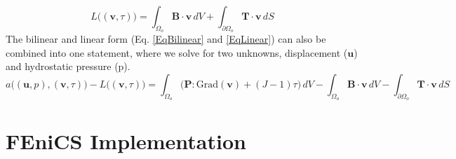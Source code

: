 \documentclass[12pt,3p]{article}
\begin{document}
\begin{equation}\label{EqLinear}
L \big( (\mathbf{v}, \tau) \big) 
	= \int_{\Omega_o} \mathbf{B} \cdot \mathbf{v} \, dV 
	+ \int_{\partial \Omega_o} \mathbf{T} \cdot \mathbf{v} \, dS
\end{equation}
The bilinear and linear form (Eq. \ref{EqBilinear} and \ref{EqLinear}) can also be combined into one statement, where we solve for two unknowns, displacement ($\mathbf{u}$) and hydrostatic pressure (p). 
\begin{equation}
a \big( (\mathbf{u}, p),( \mathbf{v}, \tau) \big) - L \big( (\mathbf{v}, \tau) \big) 
	= \int_{\Omega_o} \big( \mathbf{P} : \text{Grad}(\mathbf{v}) 
	+ (J-1) \tau \big) \, dV
	- \int_{\Omega_o} \mathbf{B} \cdot \mathbf{v} \, dV 
	- \int_{\partial \Omega_o} \mathbf{T} \cdot \mathbf{v} \, dS
\end{equation}

\section{FEniCS Implementation}
\vspace{-2ex}
\end{document}
